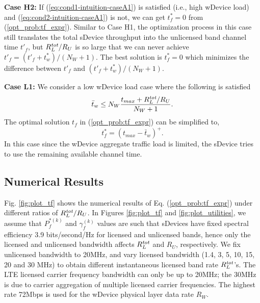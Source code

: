 \documentclass[journal,final,letterpaper,10pt,doublecolumn,twoside]{IEEEtran}
\begin{document}
\textbf{Case H2:} If  (\ref{eq:cond1-intuition-caseA1}) is satisfied (i.e., high wDevice load) and (\ref{eq:cond2-intuition-caseA1}) is not, we can get  $t^*_f = 0$ from (\ref{opt_prob:tf_expr}). Similar to Case H1, the optimization process in this case still translates the total sDevice throughput into the unlicensed band channel time $t'_f$, but $R^{\emph{tot}}_L /{R_U}$ is so large that we can never achieve  $t'_f = (t'_f+t_w^*)/(N_W +1)$. The best solution is $t^*_f = 0$ which minimizes the difference between $t'_f$ and $(t'_f+t_w^*)/(N_W +1)$.

\textbf{Case L1:} We consider a low wDevice load case where  the following is satisfied
\begin{equation}
\bar{t}_w \leq N_W \frac{{t_{max} + R^{\emph{tot}}_L /R_U}}{N_W +1}.  \label{eq:cond1-intuition-caseL1}
\end{equation}
The optimal solution $t_f$ in (\ref{opt_prob:tf_expr}) can be simplified to,
\begin{equation}
t^*_f = (t_{max} - \bar{t}_w)^+.  \label{eq:result-intuition-caseL1}
\end{equation}
In this case since the wDevice aggregate traffic load is limited, the sDevice tries to use the remaining available channel time.


\subsection{Numerical Results} \label{subsec:numerical-results}

Fig. \ref{fig:plot_tf} shows the numerical results of Eq. (\ref{opt_prob:tf_expr}) under different ratios of $R^{\emph{tot}}_L/R_U$.
In Figures \ref{fig:plot_tf} and \ref{fig:plot_utilities}, we assume that $P_f^{*(k)}$ and $\gamma_f^{(k)}$ values are such that sDevices have fixed spectral efficiency 3.9 bits/second/Hz for licensed and unlicensed bands, hence only the licensed and unlicensed bandwidth affects $R^{\emph{tot}}_L$ and $R_U$, respectively. We fix unlicensed  bandwidth to 20MHz, and vary licensed bandwidth (1.4, 3, 5, 10, 15, 20 and 30 MHz) to obtain different instantaneous licensed band rate $R^{\emph{tot}}_L$'s. The LTE licensed carrier frequency bandwidth can only be up to 20MHz; the 30MHz is due to carrier aggregation of multiple licensed carrier frequencies. The highest rate 72Mbps is used for the wDevice physical layer data rate $R_W$.
\end{document}
